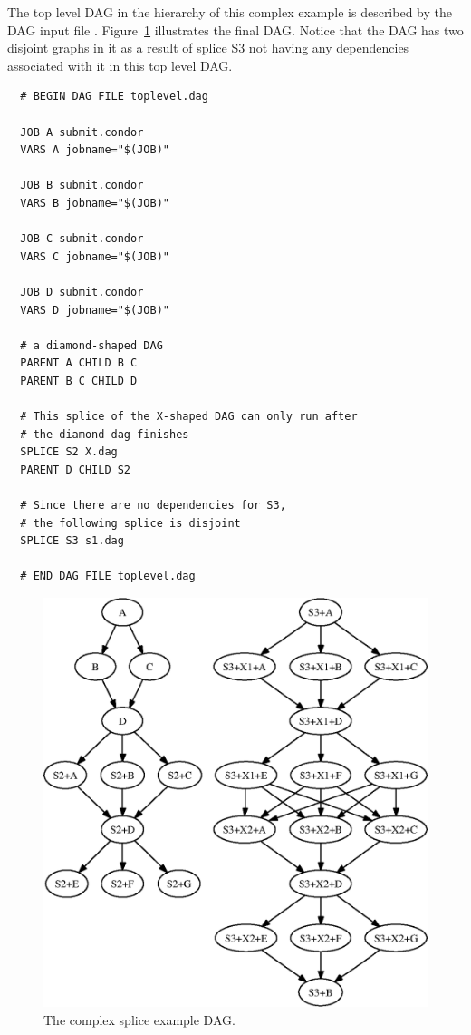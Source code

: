 The top level DAG in the hierarchy of this complex example
is described by the DAG input file .
Figure~\ref{fig:dagman-splice-complex} illustrates the final DAG.
Notice that the DAG has two disjoint graphs in it as a result of splice
S3 not having any dependencies associated with it in this top level DAG.

\begin{verbatim}
  # BEGIN DAG FILE toplevel.dag

  JOB A submit.condor
  VARS A jobname="$(JOB)"

  JOB B submit.condor
  VARS B jobname="$(JOB)"

  JOB C submit.condor
  VARS C jobname="$(JOB)"

  JOB D submit.condor
  VARS D jobname="$(JOB)"

  # a diamond-shaped DAG
  PARENT A CHILD B C
  PARENT B C CHILD D

  # This splice of the X-shaped DAG can only run after
  # the diamond dag finishes
  SPLICE S2 X.dag
  PARENT D CHILD S2

  # Since there are no dependencies for S3,
  # the following splice is disjoint 
  SPLICE S3 s1.dag

  # END DAG FILE toplevel.dag
\end{verbatim}


\begin{figure}
\centering
\includegraphics{user-man/splice-complex}
\caption{\label{fig:dagman-splice-complex} The complex splice example DAG.}
\end{figure}

